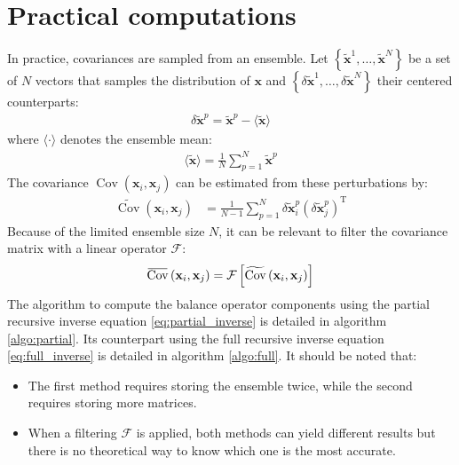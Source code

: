 \documentclass[12pt]{scrartcl}
\newcommand{\overbar}[1]{\mkern 1.5mu\overline{\mkern-1.5mu#1\mkern-1.5mu}\mkern 1.5mu}
\DeclareMathOperator{\Cov}{Cov}
\begin{document}
\section{Practical computations}
\label{sec:practical}
In practice, covariances are sampled from an ensemble. Let $\left\{\widetilde{\mathbf{x}}^1,\dots,\widetilde{\mathbf{x}}^N\right\}$ be a set of $N$ vectors that samples the distribution of $\mathbf{x}$ and $\left\{\delta \widetilde{\mathbf{x}}^1,\dots,\delta \widetilde{\mathbf{x}}^N\right\}$ their centered counterparts:
\begin{align}
\delta \widetilde{\mathbf{x}}^p = \widetilde{\mathbf{x}}^p - \langle \widetilde{\mathbf{x}} \rangle
\end{align}
where $\langle \cdot \rangle$ denotes the ensemble mean:
\begin{align}
\label{eq:exp_estim}
\langle \widetilde{\mathbf{x}} \rangle = \frac{1}{N} \sum_{p=1}^N \widetilde{\mathbf{x}}^p
\end{align}
The covariance $\Cov \left(\mathbf{x}_i,\mathbf{x}_j\right)$ can be estimated from these perturbations by:
\begin{align}
\label{eq:cov_estim}
\widetilde{\Cov}\left(\mathbf{x}_i,\mathbf{x}_j\right) & = \frac{1}{N-1} \sum_{p=1}^N \delta \widetilde{\mathbf{x}}^p_i \left(\delta \widetilde{\mathbf{x}}^p_j\right)^\mathrm{T}
\end{align}
Because of the limited ensemble size $N$, it can be relevant to filter the covariance matrix with a linear operator $\mathcal{F}$:
\begin{align}
\label{eq:cov_filter}
\overbar{\Cov}\left(\mathbf{x}_i,\mathbf{x}_j\right) = \mathcal{F} \left[\widetilde{\Cov}\left(\mathbf{x}_i,\mathbf{x}_j\right)\right]
\end{align}
$ $\\
The algorithm to compute the balance operator components using the partial recursive inverse equation \eqref{eq:partial_inverse} is detailed in algorithm \ref{algo:partial}. Its counterpart using the full recursive inverse equation \eqref{eq:full_inverse} is detailed in algorithm \ref{algo:full}. It should be noted that:
\begin{itemize}
\item The first method requires storing the ensemble twice, while the second requires storing more matrices.
\item When a filtering $\mathcal{F}$ is applied, both methods can yield different results but there is no theoretical way to know which one is the most accurate.
\end{itemize}
\end{document}
